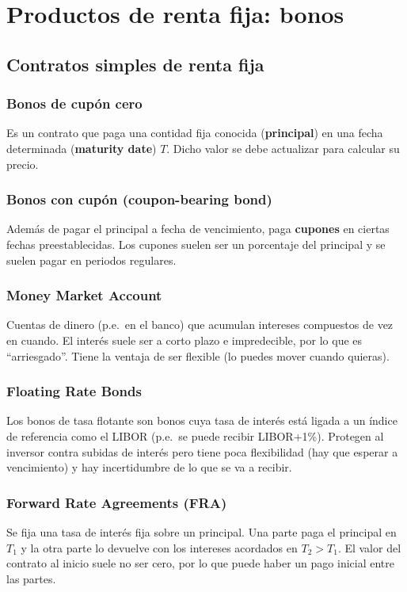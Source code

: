 \section{Productos de renta fija: bonos}



\subsection{Contratos simples de renta fija}

\subsubsection{Bonos de cupón cero}
Es un contrato que paga una contidad fija conocida (\textbf{principal}) en una fecha determinada (\textbf{maturity date}) $T$. Dicho valor se debe actualizar para calcular su precio.



\subsubsection{Bonos con cupón (coupon-bearing bond)}
Además de pagar el principal a fecha de vencimiento, paga \textbf{cupones} en ciertas fechas preestablecidas. Los cupones suelen ser un porcentaje del principal y se suelen pagar en periodos regulares.



\subsubsection{Money Market Account}
Cuentas de dinero (p.e.\ en el banco) que acumulan intereses compuestos de vez en cuando. El interés suele ser a corto plazo e impredecible, por lo que es ``arriesgado''. Tiene la ventaja de ser flexible (lo puedes mover cuando quieras).



\subsubsection{Floating Rate Bonds}
Los bonos de tasa flotante son bonos cuya tasa de interés está ligada a un índice de referencia  como el LIBOR (p.e.\ se puede recibir LIBOR+1\%). Protegen al inversor contra subidas de interés pero tiene poca flexibilidad (hay que esperar a vencimiento) y hay incertidumbre de lo que se va a recibir.



\subsubsection{Forward Rate Agreements (FRA)}
Se fija una tasa de interés fija sobre un principal. Una parte paga el principal en $T_1$ y la otra parte lo devuelve con los intereses acordados en $T_2 > T_1$. El valor del contrato al inicio suele no ser cero, por lo que puede haber un pago inicial entre las partes.



